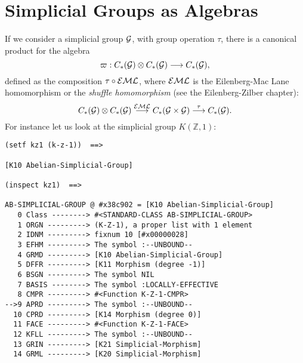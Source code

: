 \section{Simplicial Groups as Algebras}

If we consider a simplicial group ${\cal G}$, with group operation $\tau$, there is a ca\-no\-ni\-cal
product for the algebra
$$\varpi : C_*({\cal G}) \otimes C_*({\cal G}) \longrightarrow C_*({\cal G}), $$
defined as the composition $\tau \circ {\cal EML}$, where ${\cal EML}$ is the
Eilenberg-Mac Lane homomorphism or the {\em shuffle homomorphism}
(see the Eilenberg-Zilber chapter):
$$C_*({\cal G}) \otimes C_*({\cal G}) \buildrel {{\cal EML}} \over \longrightarrow
   C_*({\cal G} \times {\cal G}) \buildrel {\tau} \over \longrightarrow C_*({\cal G}). $$
For instance let us look at the simplicial group $K(\mathbb{Z}, 1)$:

{\footnotesize\begin{verbatim}
(setf kz1 (k-z-1))  ==>

[K10 Abelian-Simplicial-Group]

(inspect kz1)  ==>

AB-SIMPLICIAL-GROUP @ #x38c902 = [K10 Abelian-Simplicial-Group]
   0 Class --------> #<STANDARD-CLASS AB-SIMPLICIAL-GROUP>
   1 ORGN ---------> (K-Z-1), a proper list with 1 element
   2 IDNM ---------> fixnum 10 [#x00000028]
   3 EFHM ---------> The symbol :--UNBOUND--
   4 GRMD ---------> [K10 Abelian-Simplicial-Group]
   5 DFFR ---------> [K11 Morphism (degree -1)]
   6 BSGN ---------> The symbol NIL
   7 BASIS --------> The symbol :LOCALLY-EFFECTIVE
   8 CMPR ---------> #<Function K-Z-1-CMPR>
-->9 APRD ---------> The symbol :--UNBOUND--
  10 CPRD ---------> [K14 Morphism (degree 0)]
  11 FACE ---------> #<Function K-Z-1-FACE>
  12 KFLL ---------> The symbol :--UNBOUND--
  13 GRIN ---------> [K21 Simplicial-Morphism]
  14 GRML ---------> [K20 Simplicial-Morphism]
\end{verbatim}}

